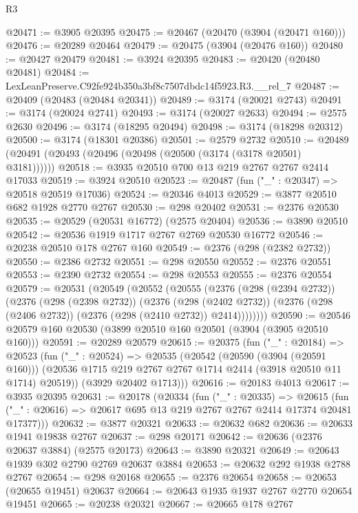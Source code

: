 \begin{lexlean}{R3}
\begin{coremodule}
@20471 := @3905 @20395
@20475 := @20467 (@20470 (@3904 (@20471 @160)))
@20476 := @20289 @20464
@20479 := @20475 (@3904 (@20476 @160))
@20480 := @20427 @20479
@20481 := @3924 @20395
@20483 := @20420 (@20480 @20481)
@20484 := LexLeanPreserve.C92fe924b350a3bf8c7507dbdc14f5923.R3.__rel_7
@20487 := @20409 (@20483 (@20484 @20341))
@20489 := @3174 (@20021 @2743)
@20491 := @3174 (@20024 @2741)
@20493 := @3174 (@20027 @2633)
@20494 := @2575 @2630
@20496 := @3174 (@18295 @20494)
@20498 := @3174 (@18298 @20312)
@20500 := @3174 (@18301 @20386)
@20501 := @2579 @2732
@20510 := @20489 (@20491 (@20493 (@20496 (@20498 (@20500 (@3174 (@3178 @20501) @3181))))))
@20518 := @3935 @20510 @700 @13 @219 @2767 @2767 @2414 @17033
@20519 := @3924 @20510
@20523 := @20487 (fun ("_" : @20347) => @20518 @20519 @17036)
@20524 := @20346 @4013
@20529 := @3877 @20510 @682 @1928 @2770 @2767
@20530 := @298 @20402
@20531 := @2376 @20530
@20535 := @20529 (@20531 @16772) (@2575 @20404)
@20536 := @3890 @20510
@20542 := @20536 @1919 @1717 @2767 @2769 @20530 @16772
@20546 := @20238 @20510 @178 @2767 @160
@20549 := @2376 (@298 (@2382 @2732))
@20550 := @2386 @2732
@20551 := @298 @20550
@20552 := @2376 @20551
@20553 := @2390 @2732
@20554 := @298 @20553
@20555 := @2376 @20554
@20579 := @20531
    (@20549
      (@20552
        (@20555
          (@2376
            (@298 (@2394 @2732))
            (@2376
              (@298 (@2398 @2732))
              (@2376
                (@298 (@2402 @2732))
                (@2376 (@298 (@2406 @2732)) (@2376 (@298 (@2410 @2732)) @2414))))))))
@20590 := @20546 @20579 @160 @20530 (@3899 @20510 @160 @20501 (@3904 (@3905 @20510 @160)))
@20591 := @20289 @20579
@20615 := @20375
    (fun ("_" : @20184) =>
    @20523
      (fun ("_" : @20524) =>
      @20535
        (@20542
          (@20590 (@3904 (@20591 @160)))
          (@20536 @1715 @219 @2767 @2767 @1714 @2414 (@3918 @20510 @11 @1714) @20519))
        (@3929 @20402 @1713)))
@20616 := @20183 @4013
@20617 := @3935 @20395
@20631 := @20178
    (@20334
      (fun ("_" : @20335) =>
      @20615 (fun ("_" : @20616) => @20617 @695 @13 @219 @2767 @2767 @2414 @17374 @20481 @17377)))
@20632 := @3877 @20321
@20633 := @20632 @682
@20636 := @20633 @1941 @19838 @2767
@20637 := @298 @20171
@20642 := @20636 (@2376 @20637 @3884) (@2575 @20173)
@20643 := @3890 @20321
@20649 := @20643 @1939 @302 @2790 @2769 @20637 @3884
@20653 := @20632 @292 @1938 @2788 @2767
@20654 := @298 @20168
@20655 := @2376 @20654
@20658 := @20653 (@20655 @19451) @20637
@20664 := @20643 @1935 @1937 @2767 @2770 @20654 @19451
@20665 := @20238 @20321
@20667 := @20665 @178 @2767

\end{coremodule}
\end{lexlean}
